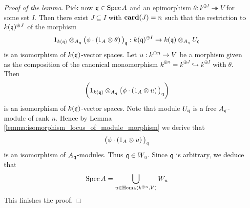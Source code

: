 \begin{proof}[Proof of the lemma]
Pick now $\mathfrak{q}\in \mathrm{Spec}\, A$ and an epimorphism $\theta:k^{\oplus I}\twoheadrightarrow V$ for some set $I$. Then there exist $J\subseteq I$ with $\mathbf{card}(J) = n$ such that the restriction to $k(\mathfrak{q})^{\oplus J}$ of the morphism
$$1_{k(\mathfrak{q})}\otimes_{A_{\mathfrak{q}}}\big(\phi\cdot \left(1_A\otimes \theta\right)\big)_{\mathfrak{q}}:k(\mathfrak{q})^{\oplus I}\rightarrow k(\mathfrak{q})\otimes_{A_{\mathfrak{q}}}U_{\mathfrak{q}}$$
is an isomorphism of $k(\mathfrak{q})$-vector spaces. Let $u:k^{\oplus n}\rightarrow V$ be a morphism given as the composition of the canonical monomorphism $k^{\oplus n} = k^{\oplus J}\hookrightarrow k^{\oplus I}$ with $\theta$. Then
$$\bigg(1_{k(\mathfrak{q})}\otimes_{A_{\mathfrak{q}}}\big(\phi\cdot \left(1_A\otimes u\right)\big)_{\mathfrak{q}}\bigg)$$
is an isomorphism of $k(\mathfrak{q})$-vector spaces. Note that module $U_{\mathfrak{q}}$ is a free $A_{\mathfrak{q}}$-module of rank $n$. Hence by Lemma \ref{lemma:isomorphism_locus_of_module_morphism} we derive that
$$\big(\phi\cdot \left(1_A\otimes u\right)\big)_{\mathfrak{q}}$$
is an isomorphism of $A_{\mathfrak{q}}$-modules. Thus $\mathfrak{q} \in W_u$. Since $\mathfrak{q}$ is arbitrary, we deduce that
$$\mathrm{Spec}\, A = \bigcup_{u\in \mathrm{Hom}_{k}(k^{\oplus n},V)}W_u$$
This finishes the proof.
\end{proof}


